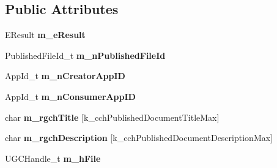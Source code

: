 \subsection*{Public Attributes}
\begin{DoxyCompactItemize}
\item 
\hypertarget{structRemoteStorageGetPublishedFileDetailsResult__t_affc5234f994daa21b7e218ff6cf84e34}{}E\+Result {\bfseries m\+\_\+e\+Result}\label{structRemoteStorageGetPublishedFileDetailsResult__t_affc5234f994daa21b7e218ff6cf84e34}

\item 
\hypertarget{structRemoteStorageGetPublishedFileDetailsResult__t_a1bdabfa0ee6423e6c53f0580476c35f7}{}Published\+File\+Id\+\_\+t {\bfseries m\+\_\+n\+Published\+File\+Id}\label{structRemoteStorageGetPublishedFileDetailsResult__t_a1bdabfa0ee6423e6c53f0580476c35f7}

\item 
\hypertarget{structRemoteStorageGetPublishedFileDetailsResult__t_a7b3d6dbbac07a7452412c802a0700d85}{}App\+Id\+\_\+t {\bfseries m\+\_\+n\+Creator\+App\+I\+D}\label{structRemoteStorageGetPublishedFileDetailsResult__t_a7b3d6dbbac07a7452412c802a0700d85}

\item 
\hypertarget{structRemoteStorageGetPublishedFileDetailsResult__t_a6e90dcf7ad86083176d0d1262a403866}{}App\+Id\+\_\+t {\bfseries m\+\_\+n\+Consumer\+App\+I\+D}\label{structRemoteStorageGetPublishedFileDetailsResult__t_a6e90dcf7ad86083176d0d1262a403866}

\item 
\hypertarget{structRemoteStorageGetPublishedFileDetailsResult__t_a3c58f292bb703f06f3071c9ce2bfbfa9}{}char {\bfseries m\+\_\+rgch\+Title} \mbox{[}k\+\_\+cch\+Published\+Document\+Title\+Max\mbox{]}\label{structRemoteStorageGetPublishedFileDetailsResult__t_a3c58f292bb703f06f3071c9ce2bfbfa9}

\item 
\hypertarget{structRemoteStorageGetPublishedFileDetailsResult__t_a85798fbc2e71d461da7488bb7fdc9561}{}char {\bfseries m\+\_\+rgch\+Description} \mbox{[}k\+\_\+cch\+Published\+Document\+Description\+Max\mbox{]}\label{structRemoteStorageGetPublishedFileDetailsResult__t_a85798fbc2e71d461da7488bb7fdc9561}

\item 
\hypertarget{structRemoteStorageGetPublishedFileDetailsResult__t_a71b8f6368768e9fe4992fe8cf810db18}{}U\+G\+C\+Handle\+\_\+t {\bfseries m\+\_\+h\+File}\label{structRemoteStorageGetPublishedFileDetailsResult__t_a71b8f6368768e9fe4992fe8cf810db18}


\end{DoxyCompactItemize}
